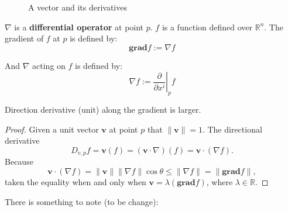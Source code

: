 \begin{figure}[!ht]
	\centering
    
    \caption{A vector and its derivatives}
    \label{dirder}
\end{figure}

\begin{definition}[Gradient]
	$\nabla$ is a \textbf{differential operator} at point $p$. $f$ is a function defined over $\mathbb{R}^n$. The gradient of $f$ at $p$ is defined by:
	\[\mathbf{grad}f:=\nabla f\]

	And $\nabla$ acting on $f$ is defined by:
	\[\nabla f:=\left.\frac{\partial}{\partial x^i}\right|_p f\]
\end{definition}

\begin{proposition}
	Direction derivative (unit) along the gradient is larger.
	\begin{proof}
		Given a unit vector $\bm{v}$ at point $p$ that $\|\bm{v}\|=1$. The directional derivative
		\[
			D_{v,p}f = \bm{v}(f) = (\bm{v}\cdot\nabla)(f) = \bm{v}\cdot(\nabla f).
		\]
		Because
		\[
			\bm{v}\cdot(\nabla f) = \|\bm{v}\|\|\nabla f\|\cos\theta\leq \|\nabla f\|=\|\mathbf{grad}f\|,
		\]
		taken the equality when and only when $\bm{v}=\lambda(\mathbf{grad}f)$, where $\lambda\in\mathbb{R}$.
	\end{proof}
\end{proposition}


There is something to note (to be change):

